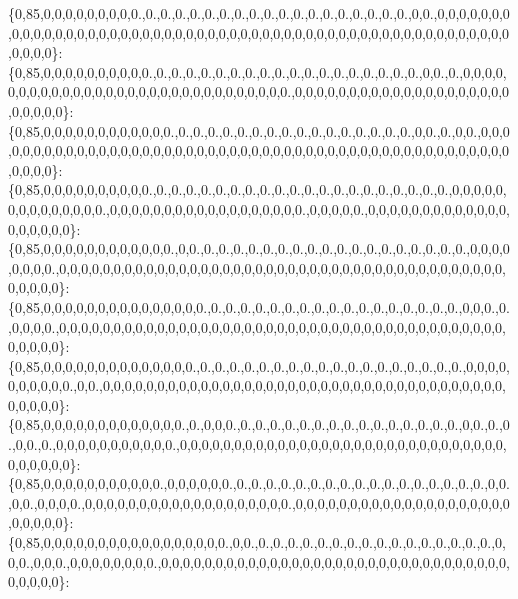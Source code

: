 \{0,85,0,0,0,0,0,0,0,0,0.,0.,0.,0.,0.,0.,0.,0.,0.,0.,0.,0.,0.,0.,0.,0.,0.,0.,0.,0,0.,0,0,0,0,0,0,0,0,0,0,0,0,0,0,0,0,0,0,0,0,0,0,0,0,0,0,0,0,0,0,0,0,0,0,0,0,0,0,0,0,0,0,0,0,0,0,0,0,0,0,0,0,0,0,0,0,0\}\+: \{0,85,0,0,0,0,0,0,0,0,0,0.,0.,0.,0.,0.,0.,0.,0.,0.,0.,0.,0.,0.,0.,0.,0.,0.,0.,0.,0,0.,0.,0,0,0,0,0,0,0,0,0,0,0,0,0,0,0,0,0,0,0,0,0,0,0,0,0,0,0,0,0,0.,0,0,0,0,0,0,0,0,0,0,0,0,0,0,0,0,0,0,0,0,0,0,0,0,0\}\+: \{0,85,0,0,0,0,0,0,0,0,0,0,0,0.,0.,0.,0.,0.,0.,0.,0.,0.,0.,0.,0.,0.,0.,0.,0.,0.,0,0.,0.,0,0.,0,0,0,0,0,0,0,0,0,0,0,0,0,0,0,0,0,0,0,0,0,0,0,0,0,0,0,0,0,0,0,0,0,0,0,0,0,0,0,0,0,0,0,0,0,0,0,0,0,0,0,0,0\}\+: \{0,85,0,0,0,0,0,0,0,0,0,0.,0.,0.,0.,0.,0.,0.,0.,0.,0.,0.,0.,0.,0.,0.,0.,0.,0.,0.,0.,0.,0,0,0,0,0,0,0,0,0,0,0,0,0,0.,0,0,0,0,0,0,0,0,0,0,0,0,0,0,0,0,0,0.,0,0,0,0,0.,0,0,0,0,0,0,0,0,0,0,0,0,0,0,0,0,0,0,0\}\+: \{0,85,0,0,0,0,0,0,0,0,0,0,0,0.,0,0.,0.,0.,0.,0.,0.,0.,0.,0.,0.,0.,0.,0.,0.,0.,0.,0.,0.,0.,0,0,0,0,0,0,0,0.,0,0,0,0,0,0,0,0,0,0,0,0,0,0,0,0,0,0,0,0,0,0,0,0,0,0,0,0,0,0,0,0,0,0,0,0,0,0,0,0,0,0,0,0,0,0\}\+: \{0,85,0,0,0,0,0,0,0,0,0,0,0,0,0,0,0.,0.,0.,0.,0.,0.,0.,0.,0.,0.,0.,0.,0.,0.,0.,0.,0.,0.,0,0,0.,0.,0,0,0,0.,0,0,0,0,0,0,0,0,0,0,0,0,0,0,0,0,0,0,0,0,0,0,0,0,0,0,0,0,0,0,0,0,0,0,0,0,0,0,0,0,0,0,0,0,0,0\}\+: \{0,85,0,0,0,0,0,0,0,0,0,0,0,0,0,0.,0.,0.,0.,0.,0.,0.,0.,0.,0.,0.,0.,0.,0.,0.,0.,0.,0.,0.,0,0,0,0,0,0,0,0,0,0.,0,0.,0,0,0,0,0,0,0,0,0,0,0,0,0,0,0,0,0,0,0,0,0,0,0,0,0,0,0,0,0,0,0,0,0,0,0,0,0,0,0,0,0,0\}\+: \{0,85,0,0,0,0,0,0,0,0,0,0,0,0,0.,0.,0,0,0.,0.,0.,0.,0.,0.,0.,0.,0.,0.,0.,0.,0.,0.,0.,0.,0,0.,0.,0.,0,0.,0.,0,0,0,0,0,0,0,0,0,0,0.,0,0,0,0,0,0,0,0,0,0,0,0,0,0,0,0,0,0,0,0,0,0,0,0,0,0,0,0,0,0,0,0,0,0,0,0\}\+: \{0,85,0,0,0,0,0,0,0,0,0,0,0.,0,0,0,0,0,0.,0.,0.,0.,0.,0.,0.,0.,0.,0.,0.,0.,0.,0.,0.,0.,0.,0.,0,0.,0,0.,0,0,0,0.,0,0,0,0,0,0,0,0,0,0,0,0,0,0,0,0,0,0,0.,0,0,0,0,0,0,0,0,0,0,0,0,0,0,0,0,0,0,0,0,0,0,0,0,0\}\+: \{0,85,0,0,0,0,0,0,0,0,0,0,0,0,0,0,0,0,0.,0,0.,0.,0.,0.,0.,0.,0.,0.,0.,0.,0.,0.,0.,0.,0.,0.,0.,0,0,0.,0,0,0.,0,0,0,0,0,0,0,0.,0,0,0,0,0,0,0,0,0,0,0,0,0,0,0,0,0,0,0,0,0,0,0,0,0,0,0,0,0,0,0,0,0,0,0,0,0\}\+: 